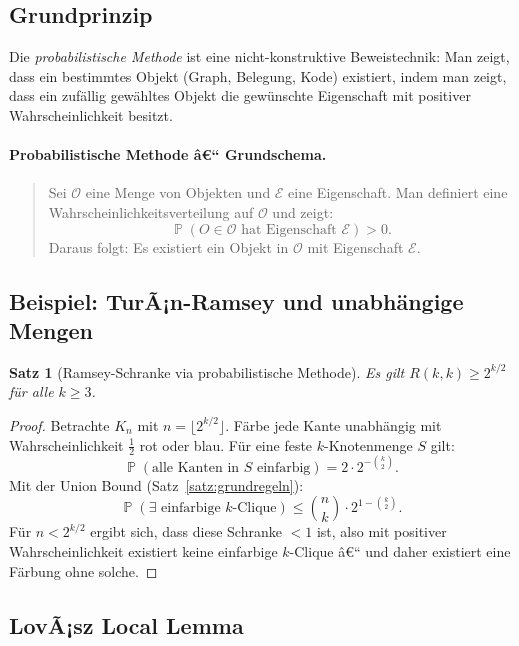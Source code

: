 ﻿\documentclass[12pt,a4paper]{article}
\theoremstyle{definition}
\theoremstyle{plain}
\newtheorem{satz}{Satz}[section]
\theoremstyle{remark}
\DeclareMathOperator{\Prob}{\mathbb{P}}
\begin{document}
\subsection{Grundprinzip}

Die \emph{probabilistische Methode} \cite{alon2016probabilistic} ist eine
nicht-konstruktive Beweistechnik: Man zeigt, dass ein bestimmtes Objekt
(Graph, Belegung, Kode) existiert, indem man zeigt, dass ein zufällig
gewähltes Objekt die gewünschte Eigenschaft mit positiver Wahrscheinlichkeit
besitzt.

\paragraph*{Probabilistische Methode â€“ Grundschema.}
\begin{quote}
  Sei $\mathcal{O}$ eine Menge von Objekten und $\mathcal{E}$ eine Eigenschaft.
  Man definiert eine Wahrscheinlichkeitsverteilung auf $\mathcal{O}$ und zeigt:
  \[
    \Prob(O \in \mathcal{O} \text{ hat Eigenschaft } \mathcal{E}) > 0.
  \]
  Daraus folgt: Es existiert ein Objekt in $\mathcal{O}$ mit Eigenschaft $\mathcal{E}$.
\end{quote}

\subsection{Beispiel: TurÃ¡n-Ramsey und unabhängige Mengen}

\begin{satz}[Ramsey-Schranke via probabilistische Methode]\label{satz:ramsey}
  Es gilt $R(k,k) \geq 2^{k/2}$ für alle $k \geq 3$.
\end{satz}

\begin{proof}
  Betrachte $K_n$ mit $n = \lfloor 2^{k/2} \rfloor$. Färbe jede Kante
  unabhängig mit Wahrscheinlichkeit $\frac{1}{2}$ rot oder blau. Für eine
  feste $k$-Knotenmenge $S$ gilt:
  \[
    \Prob(\text{alle Kanten in }S\text{ einfarbig}) = 2 \cdot 2^{-\binom{k}{2}}.
  \]
  Mit der Union Bound (Satz~\ref{satz:grundregeln}):
  \[
    \Prob(\exists \text{ einfarbige } k\text{-Clique}) \leq \binom{n}{k} \cdot 2^{1-\binom{k}{2}}.
  \]
  Für $n < 2^{k/2}$ ergibt sich, dass diese Schranke $< 1$ ist, also mit
  positiver Wahrscheinlichkeit existiert keine einfarbige $k$-Clique â€“
  und daher existiert eine Färbung ohne solche.
\end{proof}

\subsection{LovÃ¡sz Local Lemma}
\end{document}

